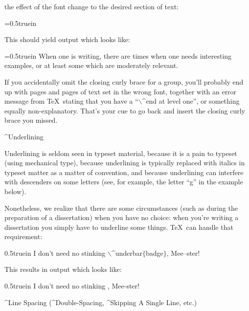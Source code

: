 the effect of the font change to the desired section of text:
\bigskip\par\noindent
{\parindent=0.5truein\smallskip\par}
\bigskip\par\noindent
This should yield output which looks like:
\bigskip\par\noindent
{\parindent=0.5truein\narrower
When one is writing, there are times when one needs 
{\twlbf interesting} examples, or at least some which are 
{\twlit moderately relevant.}\bigskip\par\noindent}
If you accidentally omit the closing curly brace for a group,
you'll probably end up with pages and pages of text set in the
wrong font, together with an error message from \TeX\ 
stating that you have a ``{\twltt{}$\backslash$^{end at level one}}'', or 
something equally non-explanatory. That's your cue to go back and insert the
closing curly brace you missed.
\vfill\eject
\centerline{\twlbf ^{Underlining}}
\bigskip\par\noindent
Underlining is seldom seen in typeset material, because it is a pain
to typeset (using mechanical type), because underlining is typically
replaced with italics in typeset matter as a matter of convention, and
because underlining can interfere with descenders on some letters (see,
for example, the letter ``g'' in the example below). 
\bigskip\par\noindent 
Nonetheless, we realize that there are some circumstances 
(such as during the preparation of a dissertation)
when you have no choice: when you're writing a dissertation you simply 
have to underline some things. \TeX\ can handle that requirement:
\bigskip\par\noindent\hglue 0.5truein
{\twltt I don't need no stinking 
$\backslash$^{underbar}$\{$badge$\}$, Mee--ster!}
\bigskip\par\noindent
This results in output which looks like:
\bigskip\par\noindent\hglue 0.5truein
I don't need no stinking , Mee-ster!
\bigskip\bigskip\bigskip\par\noindent
\centerline{\twlbf ^{Line Spacing} 
(^{Double-Spacing}, ^{Skipping A Single 
Line}, etc.)}
